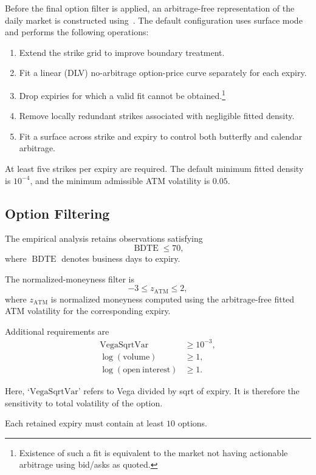 \documentclass[11pt,a4paper]{article}
\begin{document}
Before the final option filter is applied, an arbitrage-free representation of the daily market is constructed using~\citet{SANOS2026}. The default configuration uses surface mode and performs the following operations:
%
\begin{enumerate}
    \item Extend the strike grid to improve boundary treatment.
    \item Fit a linear (DLV) no-arbitrage option-price curve separately for each expiry.
    \item Drop expiries for which a valid fit cannot be obtained.\footnote{
        Existence of such a fit is equivalent to the market not having actionable arbitrage
        using bid/asks as quoted.    
    }
    \item Remove locally redundant strikes associated with negligible fitted density.
    \item Fit a surface across strike and expiry to control both butterfly and calendar arbitrage.
\end{enumerate}

At least five strikes per expiry are required. The default minimum fitted density is \(10^{-4}\), and the minimum admissible ATM volatility is \(0.05\).

\subsection{Option Filtering}

The empirical analysis retains observations satisfying
%
\[
    \operatorname{BDTE} \leq 70,
\]
%
where \(\operatorname{BDTE}\) denotes business days to expiry.

The normalized-moneyness filter is
%
\[
    -3 \leq z_{\mathrm{ATM}} \leq 2,
\]
%
where \(z_{\mathrm{ATM}}\) is normalized moneyness computed using the
arbitrage-free fitted ATM volatility for the corresponding expiry.

Additional requirements are
%
\[
\begin{aligned}
    \mathrm{VegaSqrtVar} &\geq 10^{-3}, \\
    \log(\mathrm{volume}) &\geq 1, \\
    \log(\mathrm{open\ interest}) &\geq 1.
\end{aligned}
\]

Here, `$\mathrm{VegaSqrtVar}$' refers to Vega divided by sqrt of expiry. It is therefore
the sensitivity to total volatility of the option.

Each retained expiry must contain at least \(10\) options.
\end{document}
